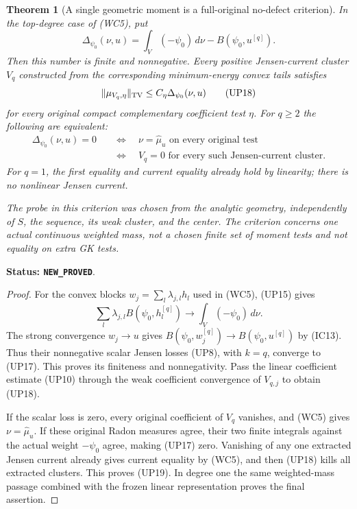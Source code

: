 \documentclass[11pt,a4paper]{article}
\numberwithin{equation}{section}
\newtheorem{theorem}{Theorem}[section]
\theoremstyle{definition}
\theoremstyle{remark}
\begin{document}
\begin{theorem}[A single geometric moment is a full-original no-defect criterion]
\label{thm:r12-single-moment-no-defect}
In the top-degree case of (WC5), put
\[
 \Delta_{\psi_0}(\nu,u)
      =\int_V(-\psi_0)\,d\nu-B(\psi_0,u^{[q]}).
 \tag{UP17}
\]
Then this number is finite and nonnegative.  Every positive
Jensen-current cluster $V_q$ constructed from the corresponding
minimum-energy convex tails satisfies
\[
                    \|\mu_{V_q,\eta}\|_{\rm TV}
                           \leq C_\eta\Delta_{\psi_0}(\nu,u)
 \tag{UP18}
\]
for every original compact complementary coefficient test $\eta$.
For $q\geq2$ the following are equivalent:
\[
 \begin{split}
 \Delta_{\psi_0}(\nu,u)=0
 &\quad\Longleftrightarrow\quad \nu=\widehat\mu_u
                  \text{ on every original test}\\
 &\quad\Longleftrightarrow\quad V_q=0
                  \text{ for every such Jensen-current cluster}.
 \end{split}
 \tag{UP19}
\]
For $q=1$, the first equality and current equality already hold
by linearity; there is no nonlinear Jensen current.

The probe in this criterion was chosen from the analytic geometry,
independently of $S$, the sequence, its weak cluster, and the center.
The criterion concerns one actual continuous weighted mass, not a
chosen finite set of moment tests and not equality on extra GK tests.
\end{theorem}

\noindent\textbf{Status: \texttt{NEW\_PROVED}}.

\begin{proof}
For the convex blocks $w_j=\sum_l\lambda_{j,l}h_l$ used in
(WC5), (UP15) gives
\[
 \sum_l\lambda_{j,l}B(\psi_0,h_l^{[q]})
                      \longrightarrow\int_V(-\psi_0)\,d\nu.
\]
The strong convergence $w_j\to u$ gives
$B(\psi_0,w_j^{[q]})\to B(\psi_0,u^{[q]})$ by (IC13).
Thus their nonnegative scalar Jensen losses (UP8), with $k=q$,
converge to (UP17).  This proves its finiteness and nonnegativity.
Pass the linear coefficient estimate (UP10) through the weak
coefficient convergence of $V_{q,j}$ to obtain (UP18).

If the scalar loss is zero, every original coefficient of $V_q$
vanishes, and (WC5) gives $\nu=\widehat\mu_u$.  If these original
Radon measures agree, their two finite integrals against the
actual weight $-\psi_0$ agree, making (UP17) zero.  Vanishing of
any one extracted Jensen current already gives current equality
by (WC5), and then (UP18) kills all extracted clusters.  This
proves (UP19).  In degree one the same weighted-mass passage
combined with the frozen linear representation proves the final
assertion.
\end{proof}
\end{document}
